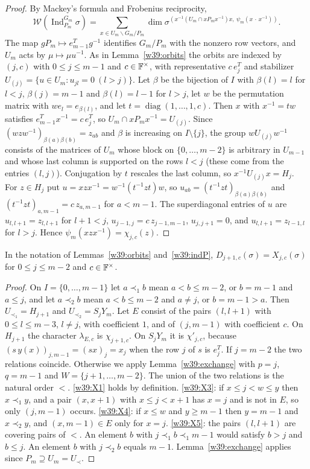 \begin{proof}
By Mackey's formula and Frobenius reciprocity,
\[
\mathcal W(\operatorname{Ind}_{P_m}^{G_m}\sigma)=\sum_{x\in U_m\backslash G_m/P_m}\dim\sigma^{(x^{-1}(U_m\cap xP_mx^{-1})x,\ \psi_m(x\,\cdot\,x^{-1}))}.
\]
The map $gP_m\mapsto e_{m-1}^Tg^{-1}$ identifies $G_m/P_m$ with the nonzero row vectors, and $U_m$ acts by $\mu\mapsto\mu u^{-1}$. As in Lemma~\ref{w39:orbits} the orbits are indexed by $(j,c)$ with $0\le j\le m-1$ and $c\in\mathbb F^\times$, with representative $c\,e_j^T$ and stabilizer $U_{(j)}=\{u\in U_m:u_{jl}=0\ (l>j)\}$. Let $\beta$ be the bijection of $I$ with $\beta(l)=l$ for $l<j$, $\beta(j)=m-1$ and $\beta(l)=l-1$ for $l>j$, let $w$ be the permutation matrix with $we_l=e_{\beta(l)}$, and let $t=\operatorname{diag}(1,\dots,1,c)$. Then $x$ with $x^{-1}=tw$ satisfies $e_{m-1}^Tx^{-1}=c\,e_j^T$, so $U_m\cap xP_mx^{-1}=U_{(j)}$. Since $(wzw^{-1})_{\beta(a)\beta(b)}=z_{ab}$ and $\beta$ is increasing on $I\setminus\{j\}$, the group $wU_{(j)}w^{-1}$ consists of the matrices of $U_m$ whose block on $\{0,\dots,m-2\}$ is arbitrary in $U_{m-1}$ and whose last column is supported on the rows $l<j$ (these come from the entries $(l,j)$). Conjugation by $t$ rescales the last column, so $x^{-1}U_{(j)}x=H_j$. For $z\in H_j$ put $u=xzx^{-1}=w^{-1}(t^{-1}zt)w$, so $u_{ab}=(t^{-1}zt)_{\beta(a)\beta(b)}$ and $(t^{-1}zt)_{a,m-1}=c\,z_{a,m-1}$ for $a<m-1$. The superdiagonal entries of $u$ are $u_{l,l+1}=z_{l,l+1}$ for $l+1<j$, $u_{j-1,j}=c\,z_{j-1,m-1}$, $u_{j,j+1}=0$, and $u_{l,l+1}=z_{l-1,l}$ for $l>j$. Hence $\psi_m(xzx^{-1})=\chi_{j,c}(z)$.
\end{proof}

\begin{lemma}\label{w39:DX}
In the notation of Lemmas~\ref{w39:orbits} and~\ref{w39:indP}, $D_{j+1,c}(\sigma)=X_{j,c}(\sigma)$ for $0\le j\le m-2$ and $c\in\mathbb F^\times$.
\end{lemma}

\begin{proof}
On $I=\{0,\dots,m-1\}$ let $a\prec_1b$ mean $a<b\le m-2$, or $b=m-1$ and $a\le j$, and let $a\prec_2b$ mean $a<b\le m-2$ and $a\ne j$, or $b=m-1>a$. Then $U_{\prec_1}=H_{j+1}$ and $U_{\prec_2}=S_jY_m$. Let $E$ consist of the pairs $(l,l+1)$ with $0\le l\le m-3$, $l\ne j$, with coefficient $1$, and of $(j,m-1)$ with coefficient $c$. On $H_{j+1}$ the character $\lambda_{E,c}$ is $\chi_{j+1,c}$. On $S_jY_m$ it is $\chi'_{j,c}$, because $(s\,y(x))_{j,m-1}=(sx)_j=x_j$ when the row $j$ of $s$ is $e_j^T$. If $j=m-2$ the two relations coincide. Otherwise we apply Lemma~\ref{w39:exchange} with $p=j$, $q=m-1$ and $W=\{j+1,\dots,m-2\}$. The union of the two relations is the natural order $<$. \ref{w39:X1} holds by definition. \ref{w39:X3}: if $x\le j<w\le y$ then $x\prec_1y$, and a pair $(x,x+1)$ with $x\le j<x+1$ has $x=j$ and is not in $E$, so only $(j,m-1)$ occurs. \ref{w39:X4}: if $x\le w$ and $y\ge m-1$ then $y=m-1$ and $x\prec_2y$, and $(x,m-1)\in E$ only for $x=j$. \ref{w39:X5}: the pairs $(l,l+1)$ are covering pairs of $<$. An element $b$ with $j\prec_1b\prec_1m-1$ would satisfy $b>j$ and $b\le j$. An element $b$ with $j\prec_2b$ equals $m-1$. Lemma~\ref{w39:exchange} applies since $P_m\supseteq U_m=U_\prec$.
\end{proof}

